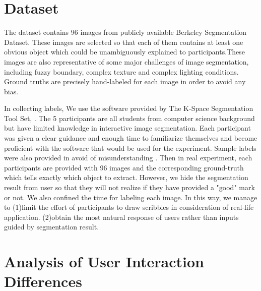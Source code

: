 \documentclass[runningheads,a4paper]{llncs}
\begin{document}
\section{Dataset}
The dataset contains 96 images from publicly available Berkeley Segmentation Dataset\cite{martin2001database}. These images are selected so that each of them contains at least one obvious object which could be unambiguously explained to participants.These images are also representative of some major challenges of image segmentation, including fuzzy boundary, complex texture and complex lighting conditions. Ground truths are precisely hand-labeled for each image in order to avoid any bias.

In collecting labels, We use the software provided by The K-Space Segmentation Tool Set, \cite{mcguinness2008k}. The 5 participants are all students from computer science background but have limited knowledge in interactive image segmentation. Each participant was given a clear guidance and enough time to familiarize themselves and become proficient with the software that would be used for the experiment. Sample labels were also provided in avoid of misunderstanding . Then in real experiment, each participants are provided with 96 images and the corresponding ground-truth which tells exactly which object to extract. However, we hide the segmentation result from user so that they will not realize if they have provided a "good" mark or not. We also confined the time for labeling each image. In this way, we manage to (1)limit the effort of participants to draw scribbles in consideration of real-life application.
(2)obtain the most natural response of users rather than inputs guided by segmentation result.

\section{Analysis of User Interaction Differences}
\end{document}
